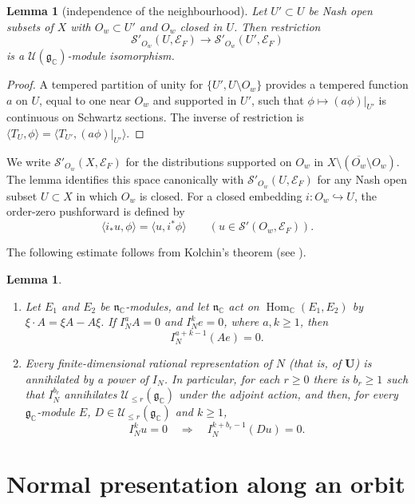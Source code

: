 \documentclass[a4paper,12pt]{amsart}
\numberwithin{equation}{section}
\newtheorem{lemma}[theorem]{Lemma}
\theoremstyle{definition}
\theoremstyle{remark}
\newcommand{\U}{\mathbf U}
\newcommand{\C}{\mathbb C}
\newcommand{\fg}{\mathfrak g}
\newcommand{\fn}{\mathfrak n}
\newcommand{\IN}{I_N}
\newcommand{\mcU}{\mathcal U}
\newcommand{\mcS}{\mathcal S}
\newcommand{\mcE}{\mathcal E}
\begin{document}
\begin{lemma}[independence of the neighbourhood]\label{lem:supported-nbhd}
Let $U'\subset U$ be Nash open subsets of $X$ with $O_w\subset U'$ and $O_w$ closed in $U$. Then restriction
\[
 \mcS'_{O_w}(U,\mcE_F)\longrightarrow\mcS'_{O_w}(U',\mcE_F)
\]
is a $\mcU(\fg_\C)$-module isomorphism.
\end{lemma}
\begin{proof}
A tempered partition of unity for $\{U',U\setminus O_w\}$ \cite[Theorem~5.2.1]{AG08} provides a tempered function $a$ on $U$, equal to one near $O_w$ and supported in $U'$, such that $\phi\mapsto(a\phi)|_{U'}$ is continuous on Schwartz sections. The inverse of restriction is $\langle T_U,\phi\rangle=\langle T_{U'},(a\phi)|_{U'}\rangle$.
\end{proof}

We write $\mcS'_{O_w}(X,\mcE_F)$ for the distributions supported on $O_w$ in $X\setminus(\overline{O_w}\setminus O_w)$. The lemma identifies this space canonically with $\mcS'_{O_w}(U,\mcE_F)$ for any Nash open subset $U\subset X$ in which $O_w$ is closed. For a closed embedding $i:O_w\hookrightarrow U$, the order-zero pushforward is defined by
\[
 \langle i_*u,\phi\rangle=\langle u,i^*\phi\rangle\qquad(u\in\mcS'(O_w,\mcE_F)).
\]

The following estimate follows from Kolchin's theorem (see \cite[Lemma~5.3 and Proposition~7.5]{Sun15}).

\begin{lemma}\label{lem:commutator}
\begin{enumerate}[label=\textup{(\alph*)}]
\item Let $E_1$ and $E_2$ be $\fn_\C$-modules, and let $\fn_\C$ act on $\operatorname{Hom}_\C(E_1,E_2)$ by $\xi\cdot A=\xi A-A\xi$. If $\IN^aA=0$ and $\IN^ke=0$, where $a,k\ge1$, then
\[
 \IN^{a+k-1}(Ae)=0.
\]
\item Every finite-dimensional rational representation of $N$ (that is, of $\U$) is annihilated by a power of $\IN$. In particular, for each $r\ge0$ there is $b_r\ge1$ such that $\IN^{b_r}$ annihilates $\mcU_{\le r}(\fg_\C)$ under the adjoint action, and then, for every $\fg_\C$-module $E$, $D\in\mcU_{\le r}(\fg_\C)$ and $k\ge1$,
\[
 \IN^ku=0\quad\Longrightarrow\quad\IN^{k+b_r-1}(Du)=0.
\]
\end{enumerate}
\end{lemma}



\section{Normal presentation along an orbit}\label{sec:normal}
\end{document}
